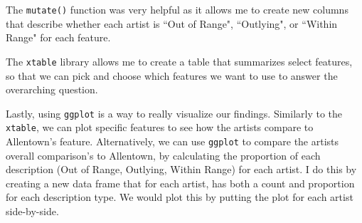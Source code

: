 \documentclass{article}\usepackage[]{graphicx}\usepackage[]{xcolor}
\begin{document}
\begin{multicols}{2}
The \texttt{mutate()} function was very helpful as it allows me to create new columns that describe whether each artist is ``Out of Range", ``Outlying", or ``Within Range" for each feature.

The \texttt{xtable} library \citep{xtable} allows me to create a table that summarizes select features, so that we can pick and choose which features we want to use to answer the overarching question.

Lastly, using \texttt{ggplot} \citep{ggplot} is a way to really visualize our findings. Similarly to the \texttt{xtable}, we can plot specific features to see how the artists compare to Allentown's feature. Alternatively, we can use \texttt{ggplot} to compare the artists overall comparison's to Allentown, by calculating the proportion of each description (Out of Range, Outlying, Within Range) for each artist. I do this by creating a new data frame that for each artist, has both a count and proportion for each description type. We would plot this by putting the plot for each artist side-by-side.

\end{multicols}
\end{document}
